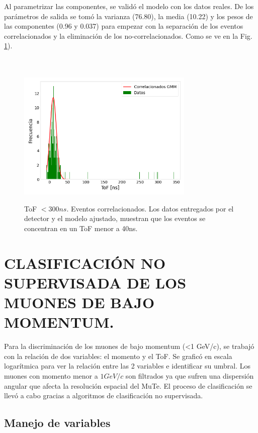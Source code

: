  Al parametrizar las componentes, se validó el modelo con los datos reales. De los parámetros de salida se tomó la varianza (76.80), la media (10.22) y los pesos de las componentes (0.96 y 0.037) para empezar con la separación de los eventos correlacionados y la eliminación de los no-correlacionados. Como se ve en la Fig. \ref{diez}).\\
 \\
 \\


\begin{figure}[h!]
\begin{center}
\caption{ToF $< 300  ns$. Eventos correlacionados. Los datos entregados por el detector y el modelo ajustado, muestran que los eventos se concentran en un ToF menor a 40ns.}
\includegraphics[width=0.75\textwidth]{Figures/imagenes/9.png}

\label{diez}
\end{center}
\end{figure}

\chapter{CLASIFICACIÓN NO SUPERVISADA DE LOS MUONES DE BAJO MOMENTUM.}
Para la discriminación de los muones de bajo momentum (<1 GeV/c), se trabajó con la relación de dos variables: el momento y el ToF. Se graficó en escala logarítmica para ver la relación entre las 2 variables e identificar su umbral.  Los muones con momento menor a $1 GeV/c$ son filtrados ya que sufren una dispersión angular que afecta la resolución espacial del MuTe. El proceso de clasificación se llevó a cabo gracias a algoritmos de clasificación no supervisada.


\section{Manejo de variables}

